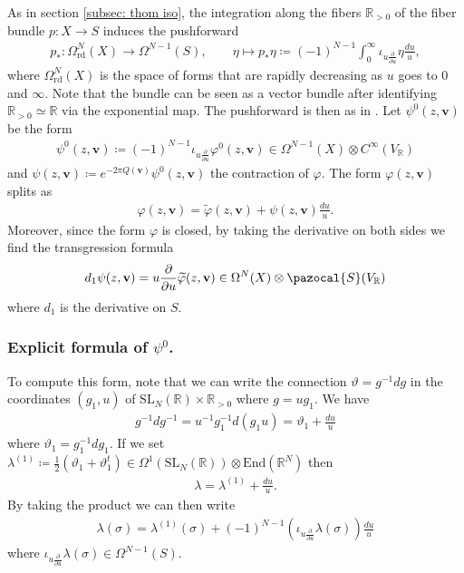 \documentclass[a4paper,11pt]{amsart} %
\newcommand{\iotau}{\iota_{u\frac{\partial}{\partial u}}}
\newcommand{\8}{\infty}
\newcommand{\vbf}{\mathbf{v}}
\newcommand{\SL}{\mathrm{SL}}
\newcommand{\R}{\mathbb{R}}
\newcommand{\End}{\mathrm{End}}
\newcommand{\Scal}{\pazocal{S}}
\newcommand{\vptil}{\widetilde{\varphi}}
\newcommand{\rd}{\textrm{rd}}
\theoremstyle{mytheoremstyle}
\theoremstyle{remark}
\numberwithin{equation}{section}
\begin{document}
As in section \ref{subsec: thom iso}, the integration along the fibers $\R_{>0}$ of the fiber bundle $p \colon X \longrightarrow S$ induces the pushforward
\begin{align}
  p_\ast \colon \Omega_{\rd}^N(X) \longrightarrow \Omega^{N-1}(S), \qquad
     \eta \longmapsto p_\ast \eta \coloneqq (-1)^{N-1}\int_0^\8 \iotau \eta \frac{du}{u},
\end{align}
where $\Omega_{\rd}^N(X)$ is the space of forms that are rapidly decreasing as $u$ goes to $0$ and $\8$. Note that the bundle can be seen as a vector bundle after identifying $\R_{>0} \simeq \R$ via the exponential map. The pushforward is then as in \cite[p.~61]{botu}. 
Let $\psi^0(z,\vbf)$ be the form
\begin{align} 
\psi^0(z,\vbf) \coloneqq (-1)^{N-1}\iota_{u\frac{\partial}{\partial u}}\varphi^0(z,\vbf)  \in \Omega^{N-1}(X) \otimes C^\8(V_\R)
\end{align}
and $\psi(z,\vbf) \coloneqq e^{-2\pi Q(\vbf)}\psi^0(z,\vbf)$ the contraction of $\varphi$. The form $\varphi(z,\vbf)$ splits as
\begin{align}   \varphi(z,\vbf)= \vptil(z,\vbf)+\psi(z,\vbf) \frac{du}{u}.
\end{align}
Moreover, since the form $\varphi$ is closed, by taking the derivative on both sides we find the transgression formula
\begin{align} \label{transgression1}
    d_1\psi(z,\vbf)= u\frac{\partial}{\partial u} \vptil(z,\vbf) \in \Omega^{N}(X)\otimes\Scal(V_\R)
\end{align}
where $d_1$ is the derivative on $S$.

\subsubsection{Explicit formula of $\psi^0$.} To compute this form, note that we can write the connection $\vartheta=g^{-1}dg$ in the coordinates $(g_1,u)$ of $\SL_N(\R) \times \R_{>0}$ where $g=ug_1$. We have
\begin{align}
    g^{-1}dg^{-1}=u^{-1}g_1^{-1}d(g_1u)=\vartheta_1+\frac{du}{u}
\end{align}
where $\vartheta_1=g_1^{-1}dg_1$. If we set $\lambda^{(1)} \coloneqq \frac{1}{2} \left ( \vartheta_1+\vartheta^t_1 \right ) \in \Omega^1(\SL_N(\R)) \otimes \End(\R^{N})$ then
\begin{align} \label{lambda1u}
    \lambda=\lambda^{(1)}+\frac{du}{u}.
\end{align}
By taking the product we can then write
\begin{align}
\lambda(\sigma)=\lambda^{(1)}(\sigma)+(-1)^{N-1}\left (\iota_{u\frac{\partial}{\partial u}}\lambda(\sigma) \right )\frac{du}{u}
\end{align}
where $\iota_{u\frac{\partial}{\partial u}}\lambda(\sigma) \in \Omega^{N-1}(S)$.
\end{document}

